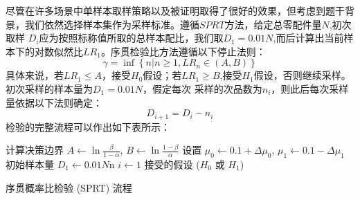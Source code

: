 \documentclass[withoutpreface,bwprint]{cumcmthesis} %
\begin{document}
尽管在许多场景中单样本取样策略以及被证明取得了很好的效果，但考虑到题干背景，我们依然选择样本集作为采样标准。遵循$SPRT$方法，给定总零配件量$N$,初次取样
$D_i$应为按照标称值所取的总样本配比，我们取$D_1=0.01N$,而后计算出当前样本下的对数似然比$LR_1$。序贯检验比方法遵循以下停止法则：
\begin{equation}
	\gamma = \inf \left\{ n | n \geq 1, LR_n \in (A, B) \right\}
\end{equation}
具体来说，若$LR_1 \le A$，接受$H_0$假设；若$LR_1 \ge B$,接受$H_1$假设，否则继续采样。初次采样的样本量为$D_1=0.01N$，假定每次
采样的次品数为$n_i$，则此后每次采样量依据以下法则确定：
\begin{equation}
	D_{i+1}=D_i-n_i
\end{equation}
检验的完整流程可以作出如下表所示：

\begin{adjustbox}{width=16cm,height=6.5cm}
	\centering
	\begin{algorithm}[H]
		\SetAlgoLined
		计算决策边界 $A \gets \ln \frac{\beta}{1 - \alpha}$, $B \gets \ln \frac{1 - \beta}{\alpha}$\;
		设置 $\mu_0 \gets 0.1 + \Delta \mu_0$, $\mu_1 \gets 0.1 - \Delta \mu_1$\;
		初始样本量 $D_1 \gets 0.01N$n\;
		$i \gets 1$\;
		\Return 接受的假设 ($H_0$ 或 $H_1$)
		\label{alg:sprt}
		\caption{序贯概率比检验 (SPRT) 流程}
	\end{algorithm}
\end{adjustbox}
\end{document}
